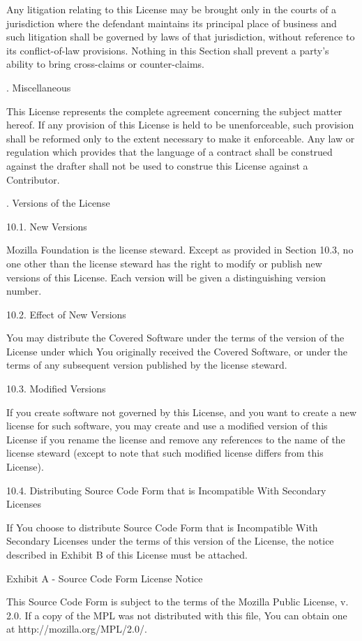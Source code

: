 Any litigation relating to this License may be brought only in the courts of a jurisdiction where the defendant maintains its principal place of business and such litigation shall be governed by laws of that jurisdiction, without reference to its conflict-of-law provisions. Nothing in this Section shall prevent a party’s ability to bring cross-claims or counter-claims.

. Miscellaneous

This License represents the complete agreement concerning the subject matter hereof. If any provision of this License is held to be unenforceable, such provision shall be reformed only to the extent necessary to make it enforceable. Any law or regulation which provides that the language of a contract shall be construed against the drafter shall not be used to construe this License against a Contributor.

. Versions of the License

10.1. New Versions

Mozilla Foundation is the license steward. Except as provided in Section 10.3, no one other than the license steward has the right to modify or publish new versions of this License. Each version will be given a distinguishing version number.

10.2. Effect of New Versions

You may distribute the Covered Software under the terms of the version of the License under which You originally received the Covered Software, or under the terms of any subsequent version published by the license steward.

10.3. Modified Versions

If you create software not governed by this License, and you want to create a new license for such software, you may create and use a modified version of this License if you rename the license and remove any references to the name of the license steward (except to note that such modified license differs from this License).

10.4. Distributing Source Code Form that is Incompatible With Secondary Licenses

If You choose to distribute Source Code Form that is Incompatible With Secondary Licenses under the terms of this version of the License, the notice described in Exhibit B of this License must be attached.

\vparasmall
Exhibit A - Source Code Form License Notice

This Source Code Form is subject to the terms of the Mozilla Public License, v. 2.0. If a copy of the MPL was not distributed with this file, You can obtain one at http://mozilla.org/MPL/2.0/.

